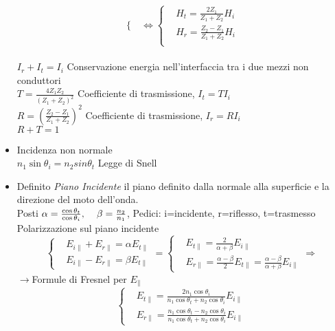 \documentclass[a4paper]{article}
\begin{document}
\begin{itemize}
\begin{equation*}
\begin{cases}
	\end{cases} \iff
	\begin{cases}
		& H_t=\frac{2Z_1}{Z_1+Z_2}H_i\\
		& H_r=\frac{Z_2-Z_1}{Z_1+Z_2}H_i\\	
	\end{cases}
\end{equation*}\\
$I_r+I_t=I_i$ Conservazione energia nell'interfaccia tra i due mezzi non conduttori\\
$T=\frac{4Z_1Z_2}{(Z_1+Z_2)^2}$ Coefficiente di trasmissione, $I_t=TI_i$\\
$R=(\frac{Z_2-Z_1}{Z_1+Z_2})^2$ Coefficiente di trasmissione, $I_r=RI_i$\\
$R+T=1$
\item Incidenza non normale\\
$n_1 \sin\theta_i=n_2 sin \theta_t$ Legge di Snell
\item Definito \textit{Piano Incidente} il piano definito dalla normale alla superficie e la direzione del moto dell'onda.\\
Posti $\alpha = \frac{\cos \theta_t}{\cos \theta_i}, \hspace{4mm}\beta=\frac{n_2}{n_1}$,\hspace{4mm} Pedici: i=incidente, r=riflesso, t=trasmesso\\
Polarizzazione sul piano incidente
\begin{equation*}
	\begin{cases}
		& E_{i \parallel}+E_{r \parallel  }=\alpha E_{t \parallel}\\
		& E_{i \parallel}-E_{r \parallel  }=\beta E_{t \parallel}
	\end{cases}=
	\begin{cases}
		& E_{t\parallel}=\frac{2}{\alpha+\beta}E_{i\parallel}\\
		& E_{r\parallel}=\frac{\alpha - \beta}{2}E_{t\parallel}=\frac{\alpha - \beta}{\alpha + \beta}E_{i\parallel}
	\end{cases}\Rightarrow
\end{equation*}
$\rightarrow$Formule di Fresnel per $E_\parallel$
\begin{equation*}
	\begin{cases}
		&E_{t\parallel}=\frac{2n_1\cos\theta_i}{n_1 \cos \theta_t + n_2 \cos \theta_i}E_{i\parallel}\\
		&E_{r\parallel}=\frac{n_1 \cos \theta_t-n_2 \cos \theta_i}{n_1 \cos \theta_t+n_2 \cos \theta_i}E_{i\parallel}
	\end{cases}

\end{equation*}
\end{itemize}
\end{document}
